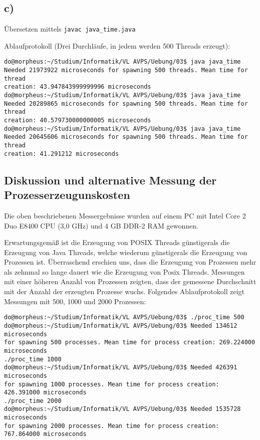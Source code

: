 \documentclass{scrartcl}
\begin{document}
\subsection*{c)}



Übersetzen mittels \lstinline[language=Bash]$javac java_time.java$

Ablaufprotokoll (Drei Durchläufe, in jedem werden 500 Threads erzeugt):\\
\begin{verbatim}
do@morpheus:~/Studium/Informatik/VL AVPS/Uebung/03$ java java_time 
Needed 21973922 microseconds for spawning 500 threads. Mean time for thread
creation: 43.947843999999996 microseconds
do@morpheus:~/Studium/Informatik/VL AVPS/Uebung/03$ java java_time 
Needed 20289865 microseconds for spawning 500 threads. Mean time for thread
creation: 40.579730000000005 microseconds
do@morpheus:~/Studium/Informatik/VL AVPS/Uebung/03$ java java_time 
Needed 20645606 microseconds for spawning 500 threads. Mean time for thread
creation: 41.291212 microseconds
\end{verbatim}
\subsection*{Diskussion und alternative Messung der Prozesserzeugunskosten}

Die oben beschriebenen Messergebnisse wurden auf einem PC mit Intel Core 2 Duo E8400 CPU (3,0 GHz) und 4 GB DDR-2 RAM gewonnen.

Erwartungsgemäß ist die Erzeugung von POSIX Threads \glqq günstiger\grqq als die Erzeugung von Java Threads, welche wiederum \glqq günstiger\grqq als die Erzeugung von Prozessen ist. Überraschend erschien uns, dass die Erzeugung von Prozessen mehr als zehnmal so lange dauert wie die Erzeugung von Posix Threads. Messungen mit einer höheren Anzahl von Prozessen zeigten, dass der gemessene Durchschnitt mit der Anzahl der erzeugten Prozesse wuchs. Folgendes Ablaufprotokoll zeigt Messungen mit 500, 1000 und 2000 Prozessen:

\begin{verbatim}
do@morpheus:~/Studium/Informatik/VL AVPS/Uebung/03$ ./proc_time 500
do@morpheus:~/Studium/Informatik/VL AVPS/Uebung/03$ Needed 134612 microseconds
for spawning 500 processes. Mean time for process creation: 269.224000 microseconds
./proc_time 1000
do@morpheus:~/Studium/Informatik/VL AVPS/Uebung/03$ Needed 426391 microseconds
for spawning 1000 processes. Mean time for process creation: 426.391000 microseconds
./proc_time 2000
do@morpheus:~/Studium/Informatik/VL AVPS/Uebung/03$ Needed 1535728 microseconds
for spawning 2000 processes. Mean time for process creation: 767.864000 microseconds
\end{verbatim}
\end{document}
